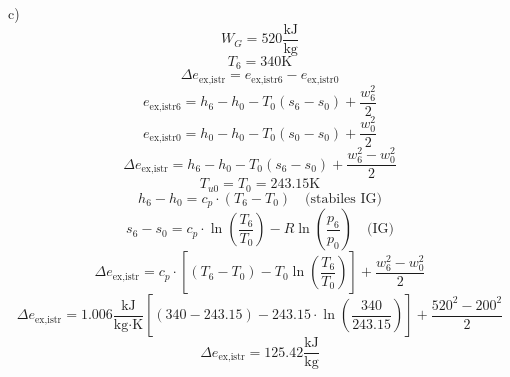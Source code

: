 c)
\[
W_G = 520 \frac{\text{kJ}}{\text{kg}}
\]
\[
T_6 = 340 \text{K}
\]
\[
\Delta e_{\text{ex,istr}} = e_{\text{ex,istr6}} - e_{\text{ex,istr0}}
\]
\[
e_{\text{ex,istr6}} = h_6 - h_0 - T_0 (s_6 - s_0) + \frac{w_6^2}{2}
\]
\[
e_{\text{ex,istr0}} = h_0 - h_0 - T_0 (s_0 - s_0) + \frac{w_0^2}{2}
\]
\[
\Delta e_{\text{ex,istr}} = h_6 - h_0 - T_0 (s_6 - s_0) + \frac{w_6^2 - w_0^2}{2}
\]
\[
T_{u0} = T_0 = 243.15 \text{K}
\]
\[
h_6 - h_0 = c_p \cdot (T_6 - T_0) \quad \text{(stabiles IG)}
\]
\[
s_6 - s_0 = c_p \cdot \ln \left( \frac{T_6}{T_0} \right) - R \ln \left( \frac{p_6}{p_0} \right) \quad \text{(IG)}
\]
\[
\Delta e_{\text{ex,istr}} = c_p \cdot \left[ (T_6 - T_0) - T_0 \ln \left( \frac{T_6}{T_0} \right) \right] + \frac{w_6^2 - w_0^2}{2}
\]
\[
\Delta e_{\text{ex,istr}} = 1.006 \frac{\text{kJ}}{\text{kg} \cdot \text{K}} \left[ (340 - 243.15) - 243.15 \cdot \ln \left( \frac{340}{243.15} \right) \right] + \frac{520^2 - 200^2}{2}
\]
\[
\Delta e_{\text{ex,istr}} = 125.42 \frac{\text{kJ}}{\text{kg}}
\]